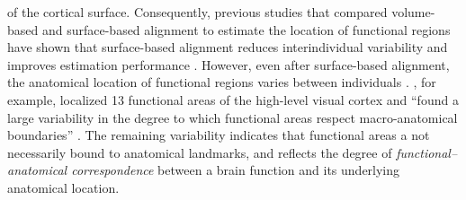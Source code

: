 of the cortical surface.
Consequently, previous studies that compared volume-based and surface-based
alignment to estimate the location of functional regions have shown that
surface-based alignment reduces interindividual variability and improves
estimation performance \citep{rosenke2021probabilistic, frost2012measuring,
wang2015probabilistic, weiner2018defining}.
However, even after surface-based alignment, the anatomical location of
functional regions varies between individuals \citep{coalson2018impact,
benson2014correction, natu2021sulcal, wang2015probabilistic, frost2012measuring,
langers2014assessment, weiner2014mid, rosenke2021probabilistic}.
\citet{frost2012measuring}, for example, localized 13 functional areas of the
high-level visual cortex and ``found a large variability in the degree to which
functional areas respect macro-anatomical boundaries'' \citep[][p.
1369]{frost2012measuring}.
The remaining variability indicates that functional areas a not necessarily
bound to anatomical landmarks, and reflects the degree of
\textit{functional--anatomical correspondence} between a brain function and its
underlying anatomical location.

